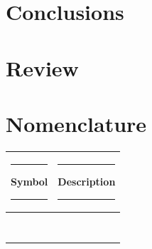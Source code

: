 \documentclass[a4]{report}
\begin{document}
	\chapter*{Conclusions}
	



	\chapter*{Review}
	



	\chapter*{Nomenclature}
	\begin{center}
		\begin{tabular}{|c|c|}
			\hline
			\rule{3cm}{0pt}\textbf{Symbol}\rule{3cm}{0pt} & \rule{3cm}{0pt}\textbf{Description}\rule{3cm}{0pt} \\
			\hline
			 & \\
			\hline
			& \\
			\hline
			& \\
			\hline
			& \\
			\hline
			& \\
			\hline
			& \\
			\hline
			& \\
			\hline
			& \\
			\hline
		\end{tabular}
	\end{center}
	
	\newpage
	
	

\end{document}

